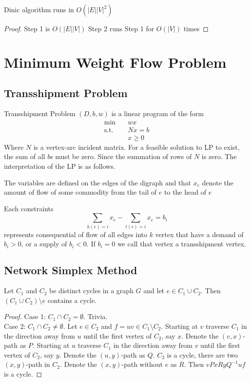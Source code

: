 			\begin{theorem}
				Dinic algorithm runs in $O(|E||V|^2)$
			\end{theorem}

			\begin{proof}
				Step 1 is $O(|E||V|)$
				Step 2 runs Step 1 for $O(|V|)$ times
			\end{proof}

	\chapter{Minimum Weight Flow Problem}
		\section{Transshipment Problem}
			Transshipment Problem $(D, b, w)$ is a linear program of the form
			\begin{align}
				\min \quad & wx\\
				\text{s.t.} \quad & Nx = b\\
								  & x \ge 0
			\end{align}
			Where $N$ is a vertex-arc incident matrix. For a feasible solution to LP to exist, the sum of all $b$s must be zero. Since the summation of rows of $N$ is zero. The interpretation of the LP is as follows.

			The variables are defined on the edges of the digraph and that $x_e$ denote the amount of flow of some commodity from the tail of $e$ to the head of $e$

			Each constraints
			\begin{equation}
				\sum_{h(e) = i} x_e - \sum_{t(e) = i}x_e = b_i
			\end{equation}
			represents consequential of flow of all edges into $k$ vertex that have a demand of $b_i > 0$, or a supply of $b_i < 0$. If $b_i = 0$ we call that vertex a transshipment vertex.

		\section{Network Simplex Method}
			\begin{lemma}
				Let $C_1$ and $C_2$ be distinct cycles in a graph $G$ and let $e\in C_1 \cup C_2$. Then $(C_1 \cup C_2) \setminus e$ contains a cycle.
			\end{lemma}

			\begin{proof}
				Case 1: $C_1 \cap C_2 = \emptyset$. Trivia.\\
				Case 2: $C_1 \cap C_2 \neq \emptyset$. Let $e\in C_2$ and $f=uv \in C_1 \setminus C_2$. Starting at $v$ traverse $C_1$ in the direction away from $u$ until the first vertex of $C_2$, say $x$. Denote the $(v, x)$-path as $P$. Starting at $u$ traverse $C_1$ in the direction away from $v$ until the first vertex of $C_2$, say $y$. Denote the $(u, y)$-path as $Q$. $C_2$ is a cycle, there are two $(x, y)$-path in $C_2$. Denote the $(x, y)$-path without $e$ as $R$. Then $vPxRyQ^{-1}uf$ is a cycle.
			\end{proof}

